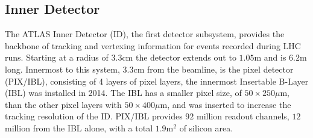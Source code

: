
\subsection{Inner Detector}

The ATLAS Inner Detector (ID), the first detector subsystem, provides the backbone of tracking and vertexing information for events recorded during LHC runs. Starting at a radius of $3.3\text{cm}$ the detector extends out to $1.05\text{m}$ and is $6.2\text{m}$ long. Innermost to this system, $3.3\text{cm}$ from the beamline, is the pixel detector (PIX/IBL), consisting of 4 layers of pixel layers, the innermost Insertable B-Layer (IBL) was installed in 2014. The IBL has a smaller pixel size, of $50\times250\mu\text{m}$, than the other pixel layers with $50\times400\mu\text{m}$, and was inserted to increase the tracking resolution of the ID. PIX/IBL provides $92$ million readout channels, $12$ million from the IBL alone, with a total $1.9\text{m}^{2}$ of silicon area.


